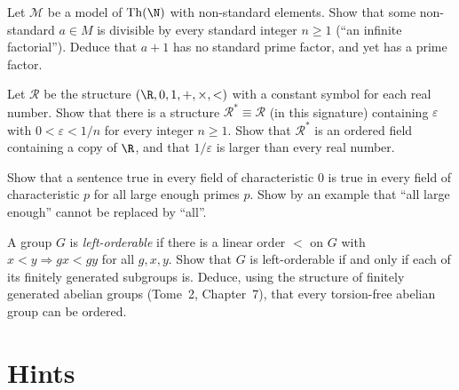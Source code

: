 \begin{exercise}[$\star\star$]\label{ex:factorial}
Let $\mathcal M$ be a model of $\mathrm{Th}(\N)$ with non-standard elements. Show that some non-standard $a\in M$ is divisible by every standard integer $n\ge1$ (``an infinite factorial''). Deduce that $a+1$ has no standard prime factor, and yet has a prime factor.
\end{exercise}

\begin{exercise}[$\star\star$]\label{ex:infinitesimal}
Let $\mathcal R$ be the structure $(\R,0,1,+,\times,<)$ with a constant symbol for each real number. Show that there is a structure $\mathcal R^*\equiv\mathcal R$ (in this signature) containing $\varepsilon$ with $0<\varepsilon<1/n$ for every integer $n\ge1$. Show that $\mathcal R^*$ is an ordered field containing a copy of $\R$, and that $1/\varepsilon$ is larger than every real number.
\end{exercise}

\begin{exercise}[$\star$]\label{ex:charp}
Show that a sentence true in every field of characteristic $0$ is true in every field of characteristic $p$ for all large enough primes $p$. Show by an example that ``all large enough'' cannot be replaced by ``all''.
\end{exercise}

\begin{exercise}[$\star\star\star$]\label{ex:orderable}
A group $G$ is \emph{left-orderable} if there is a linear order $<$ on $G$ with $x<y\Rightarrow gx<gy$ for all $g,x,y$. Show that $G$ is left-orderable if and only if each of its finitely generated subgroups is. Deduce, using the structure of finitely generated abelian groups (Tome~2, Chapter~7), that every torsion-free abelian group can be ordered.
\end{exercise}

\section{Hints}

